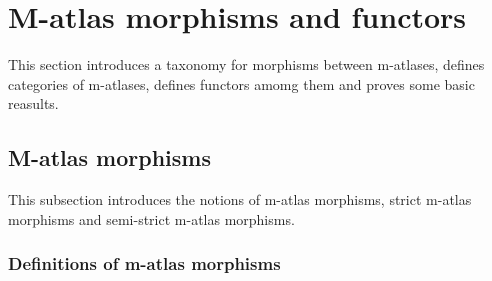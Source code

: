 \documentclass{article}
\begin{document}
\section{M-atlas morphisms and functors}
\label{sec:M-ATLmorph}
This section introduces a taxonomy for morphisms between m-atlases,
defines categories of m-atlases, defines functors amomg them and proves
some basic reasults.

\subsection{M-atlas morphisms}
\label{sub:M-ATLmorph}
This subsection introduces the notions of m-atlas morphisms, strict
m-atlas morphisms and semi-strict m-atlas morphisms.

\subsubsection{Definitions of m-atlas morphisms}
\end{document}
